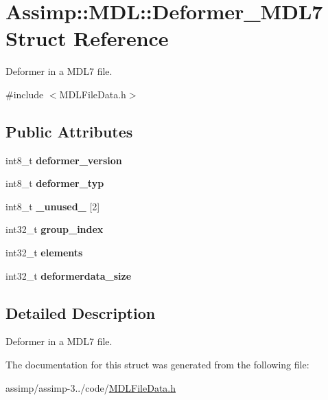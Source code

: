 \hypertarget{struct_assimp_1_1_m_d_l_1_1_deformer___m_d_l7}{\section{Assimp\+:\+:M\+D\+L\+:\+:Deformer\+\_\+\+M\+D\+L7 Struct Reference}
\label{struct_assimp_1_1_m_d_l_1_1_deformer___m_d_l7}
}


Deformer in a M\+D\+L7 file.  




{\ttfamily \#include $<$M\+D\+L\+File\+Data.\+h$>$}

\subsection*{Public Attributes}
\begin{DoxyCompactItemize}
\item 
\hypertarget{struct_assimp_1_1_m_d_l_1_1_deformer___m_d_l7_a122791c73297d192d9cec47b47be9e26}{int8\+\_\+t {\bfseries deformer\+\_\+version}}\label{struct_assimp_1_1_m_d_l_1_1_deformer___m_d_l7_a122791c73297d192d9cec47b47be9e26}

\item 
\hypertarget{struct_assimp_1_1_m_d_l_1_1_deformer___m_d_l7_a148233a8fa9b456bdad9e63fd96ba533}{int8\+\_\+t {\bfseries deformer\+\_\+typ}}\label{struct_assimp_1_1_m_d_l_1_1_deformer___m_d_l7_a148233a8fa9b456bdad9e63fd96ba533}

\item 
\hypertarget{struct_assimp_1_1_m_d_l_1_1_deformer___m_d_l7_a7afc17b8a9ca2a0e578a90db0af3cf4d}{int8\+\_\+t {\bfseries \+\_\+unused\+\_\+} \mbox{[}2\mbox{]}}\label{struct_assimp_1_1_m_d_l_1_1_deformer___m_d_l7_a7afc17b8a9ca2a0e578a90db0af3cf4d}

\item 
\hypertarget{struct_assimp_1_1_m_d_l_1_1_deformer___m_d_l7_aaeab78778cf0ed51b97928adf4b4b84f}{int32\+\_\+t {\bfseries group\+\_\+index}}\label{struct_assimp_1_1_m_d_l_1_1_deformer___m_d_l7_aaeab78778cf0ed51b97928adf4b4b84f}

\item 
\hypertarget{struct_assimp_1_1_m_d_l_1_1_deformer___m_d_l7_a82872794a0d3d616f34e450255d92853}{int32\+\_\+t {\bfseries elements}}\label{struct_assimp_1_1_m_d_l_1_1_deformer___m_d_l7_a82872794a0d3d616f34e450255d92853}

\item 
\hypertarget{struct_assimp_1_1_m_d_l_1_1_deformer___m_d_l7_a05bb751a688679e4c0b8012e126c7973}{int32\+\_\+t {\bfseries deformerdata\+\_\+size}}\label{struct_assimp_1_1_m_d_l_1_1_deformer___m_d_l7_a05bb751a688679e4c0b8012e126c7973}

\end{DoxyCompactItemize}


\subsection{Detailed Description}
Deformer in a M\+D\+L7 file. 

The documentation for this struct was generated from the following file\+:\begin{DoxyCompactItemize}
\item 
assimp/assimp-\/3../code/\hyperlink{_m_d_l_file_data_8h}{M\+D\+L\+File\+Data.\+h}\end{DoxyCompactItemize}
